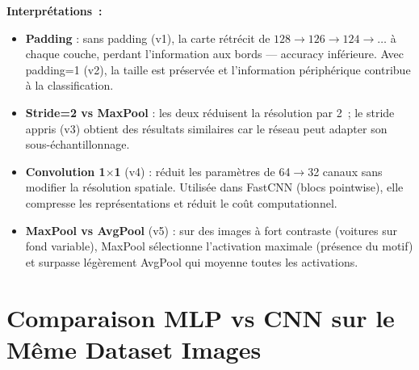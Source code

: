 \documentclass[12pt,a4paper]{report}
\begin{document}
\begin{newbox}
\textbf{Interprétations~:}
\begin{itemize}[leftmargin=*,nosep]
  \item \textbf{Padding} : sans padding (v1), la carte rétrécit de $128\to126\to124\to\ldots$ à chaque couche,
        perdant l'information aux bords --- accuracy inférieure. Avec padding=1 (v2),
        la taille est préservée et l'information périphérique contribue à la classification.
  \item \textbf{Stride=2 vs MaxPool} : les deux réduisent la résolution par 2~;
        le stride appris (v3) obtient des résultats similaires car le réseau peut 
        adapter son sous-échantillonnage.
  \item \textbf{Convolution 1$\times$1} (v4) : réduit les paramètres de 64$\to$32 canaux
        sans modifier la résolution spatiale. Utilisée dans FastCNN (blocs pointwise),
        elle compresse les représentations et réduit le coût computationnel.
  \item \textbf{MaxPool vs AvgPool} (v5) : sur des images à fort contraste (voitures sur fond 
        variable), MaxPool sélectionne l'activation maximale (présence du motif) et surpasse 
        légèrement AvgPool qui moyenne toutes les activations.
\end{itemize}
\end{newbox}

\section{Comparaison MLP vs CNN sur le Même Dataset Images}
\end{document}
